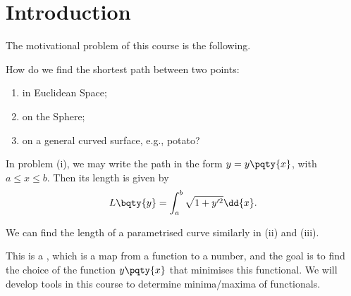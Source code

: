 \section*{Introduction}

The motivational problem of this course is the following.

\begin{problem}
    \label{prob:shortest-path}%
    How do we find the shortest path between two points:
    \begin{enumerate}
        \item in Euclidean Space;
        \item on the Sphere;
        \item on a general curved surface, e.g., potato?
    \end{enumerate}
\end{problem}

In problem (i), we may write the path in the form \(y = y\pqty{x}\), with \(a \leq x \leq b\). Then its length is given by
\[
    L \bqty{y} = \int_{a}^{b} \sqrt{1 + y'^2} \dd{x}.
\]

We can find the length of a parametrised curve similarly in (ii) and (iii).

This is a , which is a map from a function to a number, and the goal is to find the choice of the function \(y\pqty{x}\) that minimises this functional. We will develop tools in this course to determine minima/maxima  of functionals.